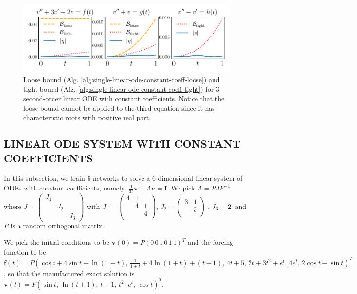 \documentclass{uai2023}
\newcommand{\vect}[1]{\mathbf{#1}}
\begin{document}
    \begin{figure}[!ht]
        \centering
        \includegraphics[width=\linewidth]{assets/2nd-order.pdf}
        \caption{\small
            Loose bound (Alg. \ref{alg:single-linear-ode-constant-coeff-loose}) and tight bound (Alg. \ref{alg:single-linear-ode-constant-coeff-tight}) for 3 second-order linear ODE with constant coefficients.
            Notice that the loose bound cannot be applied to the third equation since it has characteristic roots with positive real part.
        }\label{fig:2nd-order-bound} 
    \end{figure}

\subsection{LINEAR ODE SYSTEM WITH CONSTANT COEFFICIENTS} \label{section:high-dimension}
    \begingroup 
        \setlength\arraycolsep{1pt}
        In this subsection, we train $6$ networks to solve a $6$-dimensional linear system of ODEs with constant coefficients, namely, $\frac{\mathrm{d}}{\mathrm{d}t}\vect{v} + A\vect{v} = \vect{f}$. 
        We pick $A = PJP^{-1}$ where {\small $J=\begin{pmatrix}J_1\\[-0.75ex]&J_2\\[-0.75ex]&&J_3\end{pmatrix}$} with {\small $J_1 = \begin{pmatrix} 4&1\\[-0.75ex]&4&1\\[-0.75ex]&&4\\[-0.5ex]\end{pmatrix}$, $J_2 = \begin{pmatrix} 3&1\\[-0.75ex]&3\\[-0.5ex]\end{pmatrix}$ }, $J_3=2$, and $P$ is a random orthogonal matrix.
    \endgroup

    We pick the initial conditions to be {\small $\vect{v}(0) = P(0\, 0\, 1\, 0\, 1\, 1)^{T}$} and the forcing function to be {\small $\vect{f}(t) = P(\cos t + 4 \sin t  + \ln(1+t),\, \frac{1}{1+t} + 4 \ln(1+t) + (t+1),\, 4t + 5,\, 2t + 3t^2 + e^t,\, 4 e^t,\, 2 \cos t - \sin t )^T$}, so that the manufactured exact solution is {\small $\vect{v}(t) = P ( \sin t,\, \ln(t + 1),\, t + 1,\, t^2,\, e^t,\, \cos t)^T$}.
\end{document}

